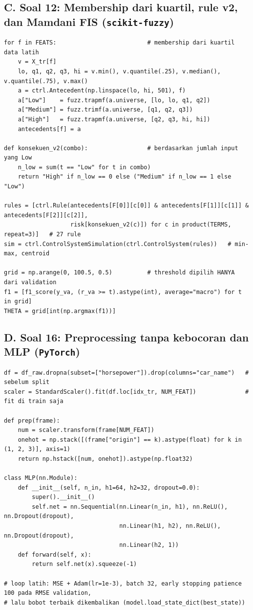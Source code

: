 \subsection*{C. Soal 12: Membership dari kuartil, rule v2, dan Mamdani FIS (\texttt{scikit-fuzzy})}
\begin{lstlisting}
for f in FEATS:                          # membership dari kuartil data latih
    v = X_tr[f]
    lo, q1, q2, q3, hi = v.min(), v.quantile(.25), v.median(), v.quantile(.75), v.max()
    a = ctrl.Antecedent(np.linspace(lo, hi, 501), f)
    a["Low"]    = fuzz.trapmf(a.universe, [lo, lo, q1, q2])
    a["Medium"] = fuzz.trimf(a.universe, [q1, q2, q3])
    a["High"]   = fuzz.trapmf(a.universe, [q2, q3, hi, hi])
    antecedents[f] = a

def konsekuen_v2(combo):                 # berdasarkan jumlah input yang Low
    n_low = sum(t == "Low" for t in combo)
    return "High" if n_low == 0 else ("Medium" if n_low == 1 else "Low")

rules = [ctrl.Rule(antecedents[F[0]][c[0]] & antecedents[F[1]][c[1]] & antecedents[F[2]][c[2]],
                   risk[konsekuen_v2(c)]) for c in product(TERMS, repeat=3)]   # 27 rule
sim = ctrl.ControlSystemSimulation(ctrl.ControlSystem(rules))   # min-max, centroid

grid = np.arange(0, 100.5, 0.5)          # threshold dipilih HANYA dari validation
f1 = [f1_score(y_va, (r_va >= t).astype(int), average="macro") for t in grid]
THETA = grid[int(np.argmax(f1))]
\end{lstlisting}

\subsection*{D. Soal 16: Preprocessing tanpa kebocoran dan MLP (\texttt{PyTorch})}
\begin{lstlisting}
df = df_raw.dropna(subset=["horsepower"]).drop(columns="car_name")   # sebelum split
scaler = StandardScaler().fit(df.loc[idx_tr, NUM_FEAT])              # fit di train saja

def prep(frame):
    num = scaler.transform(frame[NUM_FEAT])
    onehot = np.stack([(frame["origin"] == k).astype(float) for k in (1, 2, 3)], axis=1)
    return np.hstack([num, onehot]).astype(np.float32)

class MLP(nn.Module):
    def __init__(self, n_in, h1=64, h2=32, dropout=0.0):
        super().__init__()
        self.net = nn.Sequential(nn.Linear(n_in, h1), nn.ReLU(), nn.Dropout(dropout),
                                 nn.Linear(h1, h2), nn.ReLU(), nn.Dropout(dropout),
                                 nn.Linear(h2, 1))
    def forward(self, x):
        return self.net(x).squeeze(-1)

# loop latih: MSE + Adam(lr=1e-3), batch 32, early stopping patience 100 pada RMSE validation,
# lalu bobot terbaik dikembalikan (model.load_state_dict(best_state))
\end{lstlisting}

